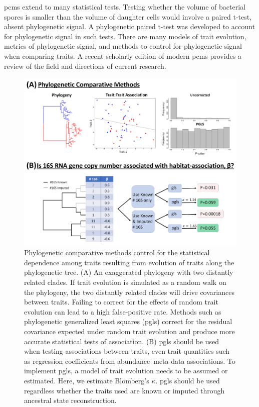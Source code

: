 \gls{pcm}s extend to many statistical tests. Testing whether the volume of bacterial spores is smaller than the volume of daughter cells would involve a paired t-test, absent phylogenetic signal. A phylogenetic paired t-test\cite{lindenfors_test} was developed to account for phylogenetic signal in such tests. There are many models of trait evolution, metrics of phylogenetic signal, and methods to control for phylogenetic signal when comparing traits. A recent scholarly edition of modern \gls{pcm}s provides a review of the field and directions of current research\cite{pgls}.\par
\begin{figure}[H]
        \centering
        \includegraphics[width=1\textwidth]{ch1/figure1.png}
        \caption[Advantages of using phylogenetic comparative methods.]
        {Phylogenetic comparative methods control for the statistical dependence among traits resulting from evolution of traits along the phylogenetic tree. (A) An exaggerated phylogeny with two distantly related clades. If trait evolution is simulated as a random walk on the phylogeny, the two distantly related clades will drive covariances between traits. Failing to correct for the effects of random trait evolution can lead to a high false-positive rate. Methods such as phylogenetic generalized least squares (\gls{pgls}) correct for the residual covariance expected under random trait evolution and produce more accurate statistical tests of association. (B) \gls{pgls} should be used when testing associations between traits, even trait quantities such as regression coefficients from abundance~meta-data associations. To implement \gls{pgls}, a model of trait evolution needs to be assumed or estimated. Here, we estimate Blomberg's $\kappa$. \gls{pgls} should be used regardless whether the traits used are known or imputed through ancestral state reconstruction.}
        \label{fig1a}
\end{figure}
